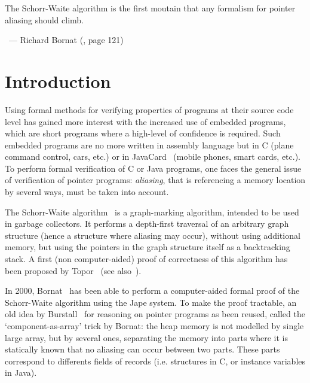


\hfill\begin{minipage}{0.6\textwidth}
\begin{slshape}
The Schorr-Waite algorithm is the first moutain that any formalism for
pointer aliasing should climb.
\end{slshape}

~\hfill --- Richard Bornat (\cite{bornat00mpc}, page 121)
\end{minipage}

\section{Introduction}

Using formal methods for verifying properties of programs at their
source code level has gained more interest with the increased use of
embedded programs, which are short programs where a high-level of
confidence is required. Such embedded programs are no more written in
assembly language but in C (plane command control, cars, etc.) or in
JavaCard~\cite{JavaCard} (mobile phones, smart cards, etc.).  To
perform formal verification of C or Java programs, one faces the
general issue of verification of pointer programs: \emph{aliasing},
that is referencing a memory location by several ways, must be taken
into account. 

The Schorr-Waite algorithm~\cite{schorr67cacm} is a graph-marking
algorithm, intended to be used in garbage collectors. It performs a
depth-first traversal of an arbitrary graph structure (hence a
structure where aliasing may occur), without using additional memory,
but using the pointers in the graph structure itself as a backtracking
stack. A first (non computer-aided) proof of correctness of this
algorithm has been proposed by Topor~\cite{topor79acta} (see
also~\cite{morris82}). %


In 2000, Bornat~\cite{bornat00mpc} has been able to perform a
computer-aided formal proof of the Schorr-Waite algorithm using the
Jape system. To make the proof tractable, an old idea by
Burstall~\cite{burstall72} for reasoning on pointer programs as been
reused, called the `component-as-array' trick by Bornat: the heap
memory is not modelled by single large array, but by several ones,
separating the memory into parts where it is statically known that no
aliasing can occur between two parts. These parts correspond to
differents fields of records (i.e. structures in C, or instance
variables in Java).

